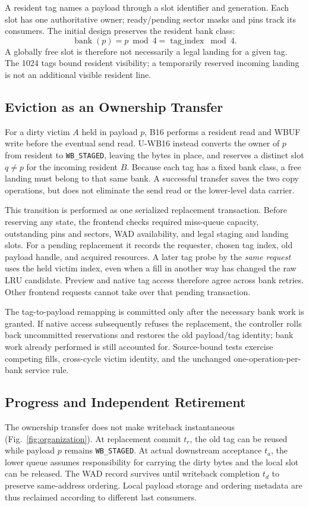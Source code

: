 \documentclass[conference,letterpaper]{IEEEtran}
\begin{document}
A resident tag names a payload through a slot identifier and generation. Each slot has one authoritative owner; ready/pending sector masks and pins track its consumers. The initial design preserves the resident bank class:
\begin{equation}
 \operatorname{bank}(p)=p\bmod4=\operatorname{tag\_index}\bmod4.
\label{eq:bank}
\end{equation}
A globally free slot is therefore not necessarily a legal landing for a given tag. The 1024 tags bound resident visibility; a temporarily reserved incoming landing is not an additional visible resident line.

\subsection{Eviction as an Ownership Transfer}
For a dirty victim $A$ held in payload $p$, B16 performs a resident read and WBUF write before the eventual send read. U-WB16 instead converts the owner of $p$ from resident to \texttt{WB\_STAGED}, leaving the bytes in place, and reserves a distinct slot $q\ne p$ for the incoming resident $B$. Because each tag has a fixed bank class, a free landing must belong to that same bank. A successful transfer saves the two copy operations, but does not eliminate the send read or the lower-level data carrier.

This transition is performed as one serialized replacement transaction. Before reserving any state, the frontend checks required miss-queue capacity, outstanding pins and sectors, WAD availability, and legal staging and landing slots. For a pending replacement it records the requester, chosen tag index, old payload handle, and acquired resources. A later tag probe by the \emph{same request} uses the held victim index, even when a fill in another way has changed the raw LRU candidate. Preview and native tag access therefore agree across bank retries. Other frontend requests cannot take over that pending transaction.

The tag-to-payload remapping is committed only after the necessary bank work is granted. If native access subsequently refuses the replacement, the controller rolls back uncommitted reservations and restores the old payload/tag identity; bank work already performed is still accounted for. Source-bound tests exercise competing fills, cross-cycle victim identity, and the unchanged one-operation-per-bank service rule.

\subsection{Progress and Independent Retirement}
The ownership transfer does not make writeback instantaneous (Fig.~\ref{fig:organization}). At replacement commit $t_r$, the old tag can be reused while payload $p$ remains \texttt{WB\_STAGED}. At actual downstream acceptance $t_a$, the lower queue assumes responsibility for carrying the dirty bytes and the local slot can be released. The WAD record survives until writeback completion $t_d$ to preserve same-address ordering. Local payload storage and ordering metadata are thus reclaimed according to different last consumers.
\end{document}
